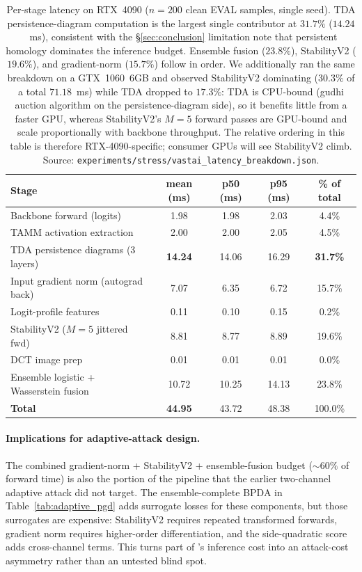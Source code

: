 \begin{table}[h]
\centering
\small
\begin{tabular}{lcccc}
\toprule
Stage & mean (ms) & p50 (ms) & p95 (ms) & \% of total \\
\midrule
Backbone forward (logits)              & 1.98  & 1.98  & 2.03  & 4.4\% \\
TAMM activation extraction             & 2.00  & 2.00  & 2.05  & 4.5\% \\
TDA persistence diagrams (3 layers)    & \textbf{14.24} & 14.06 & 16.29 & \textbf{31.7\%} \\
Input gradient norm (autograd back)    & 7.07  & 6.35  & 6.72  & 15.7\% \\
Logit-profile features                 & 0.11  & 0.10  & 0.15  & 0.2\% \\
StabilityV2 ($M{=}5$ jittered fwd)     & 8.81  & 8.77  & 8.89  & 19.6\% \\
DCT image prep                         & 0.01  & 0.01  & 0.01  & 0.0\% \\
Ensemble logistic + Wasserstein fusion & 10.72 & 10.25 & 14.13 & 23.8\% \\
\midrule
\textbf{Total}                         & \textbf{44.95} & 43.72 & 48.38 & 100.0\% \\
\bottomrule
\end{tabular}
\caption{Per-stage latency on RTX~4090 ($n{=}200$ clean EVAL samples,
single seed). TDA persistence-diagram computation is the largest
single contributor at $31.7\%$ ($14.24$~ms), consistent with the
\S\ref{sec:conclusion} limitation note that persistent homology
dominates the inference budget. Ensemble fusion ($23.8\%$),
StabilityV2 ($19.6\%$), and gradient-norm ($15.7\%$) follow in
order. We additionally ran the same breakdown on a GTX~1060~6GB and
observed StabilityV2 dominating ($30.3\%$ of a total $71.18$~ms) while
TDA dropped to $17.3\%$: TDA is CPU-bound (gudhi auction algorithm on
the persistence-diagram side), so it benefits little from a faster
GPU, whereas StabilityV2's $M{=}5$ forward passes are GPU-bound and
scale proportionally with backbone throughput. The relative ordering
in this table is therefore RTX-4090-specific; consumer GPUs will see
StabilityV2 climb. Source:
\texttt{experiments/stress/vastai\_latency\_breakdown.json}.}
\label{tab:latency_breakdown}
\end{table}

\paragraph{Implications for adaptive-attack design.}
The combined gradient-norm + StabilityV2 + ensemble-fusion budget
($\sim 60\%$ of forward time) is also the portion of the pipeline that
the earlier two-channel adaptive attack did not target. The
ensemble-complete BPDA in Table~\ref{tab:adaptive_pgd} adds surrogate
losses for these components, but those surrogates are expensive:
StabilityV2 requires repeated transformed forwards, gradient norm
requires higher-order differentiation, and the side-quadratic score
adds cross-channel terms. This turns part of \prism's inference cost
into an attack-cost asymmetry rather than an untested blind spot.

